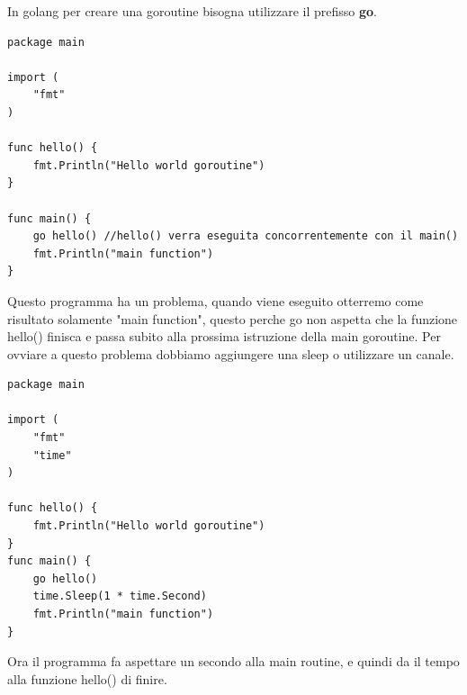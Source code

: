 In golang per creare una goroutine bisogna utilizzare il prefisso \textbf{go}.

\begin{lstlisting}
package main

import (  
    "fmt"
)

func hello() {  
    fmt.Println("Hello world goroutine")
}

func main() {  
    go hello() //hello() verra eseguita concorrentemente con il main()
    fmt.Println("main function")
}
\end{lstlisting}

Questo programma ha un problema, quando viene eseguito otterremo come risultato solamente "main function", questo perche go non aspetta che la funzione hello() finisca e passa subito alla prossima istruzione della main goroutine. Per ovviare a questo problema dobbiamo aggiungere una sleep o utilizzare un canale.

\begin{lstlisting}
package main

import (  
    "fmt"
    "time"
)

func hello() {  
    fmt.Println("Hello world goroutine")
}
func main() {  
    go hello()
    time.Sleep(1 * time.Second)
    fmt.Println("main function")
}
\end{lstlisting}

Ora il programma fa aspettare un secondo alla main routine, e quindi da il tempo alla funzione hello() di finire.